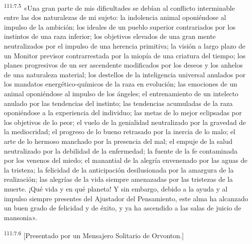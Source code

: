 \par
\textsuperscript{111:7.5} «Una gran parte de mis dificultades se debían al conflicto interminable entre las dos naturalezas de mi sujeto: la indolencia animal oponiéndose al impulso de la ambición; los ideales de un pueblo superior contrariados por los instintos de una raza inferior; los objetivos elevados de una gran mente neutralizados por el impulso de una herencia primitiva; la visión a largo plazo de un Monitor previsor contrarrestada por la miopía de una criatura del tiempo; los planes progresivos de un ser ascendente modificados por los deseos y los anhelos de una naturaleza material; los destellos de la inteligencia universal anulados por los mandatos energético-químicos de la raza en evolución; las emociones de un animal oponiéndose al impulso de los ángeles; el entrenamiento de un intelecto anulado por las tendencias del instinto; las tendencias acumuladas de la raza oponiéndose a la experiencia del individuo; las metas de lo mejor eclipsadas por los objetivos de lo peor; el vuelo de la genialidad neutralizado por la gravedad de la mediocridad; el progreso de lo bueno retrasado por la inercia de lo malo; el arte de lo hermoso manchado por la presencia del mal; el empuje de la salud neutralizado por la debilidad de la enfermedad; la fuente de la fe contaminada por los venenos del miedo; el manantial de la alegría envenenado por las aguas de la tristeza; la felicidad de la anticipación desilusionada por la amargura de la realización; las alegrías de la vida siempre amenazadas por las tristezas de la muerte. ¡Qué vida y en qué planeta! Y sin embargo, debido a la ayuda y al impulso siempre presentes del Ajustador del Pensamiento, este alma ha alcanzado un buen grado de felicidad y de éxito, y ya ha ascendido a las salas de juicio de mansonia».

\par
\textsuperscript{111:7.6} [Presentado por un Mensajero Solitario de Orvonton.]
